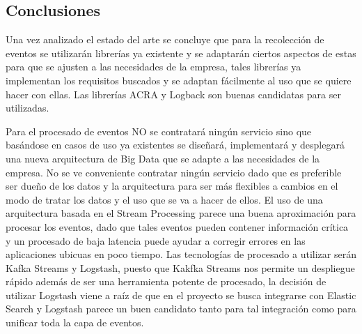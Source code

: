 \subsection{Conclusiones}
Una vez analizado el estado del arte se concluye que para la recolección de eventos se utilizarán librerías ya existente y se adaptarán ciertos aspectos de estas para que se ajusten a las necesidades de la empresa, tales librerías ya implementan los requisitos buscados y se adaptan fácilmente al uso que se quiere hacer con ellas. Las librerías ACRA y Logback son buenas candidatas para ser utilizadas.

Para el procesado de eventos NO se contratará ningún servicio sino que basándose en casos de uso ya existentes se diseñará, implementará y desplegará una nueva arquitectura de Big Data que se adapte a las necesidades de la empresa. No se ve conveniente contratar ningún servicio dado que es preferible ser dueño de los datos y la arquitectura para ser más flexibles a cambios en el modo de tratar los datos y el uso que se va a hacer de ellos. El uso de una arquitectura basada en el Stream Processing parece una buena aproximación para procesar los eventos, dado que tales eventos pueden contener información crítica y un procesado de baja latencia puede ayudar a corregir errores en las aplicaciones ubicuas en poco tiempo. Las tecnologías de procesado a utilizar serán Kafka Streams y Logstash, puesto que Kakfka Streams nos permite un despliegue rápido además de ser una herramienta potente de procesado, la decisión de utilizar Logstash viene a raíz de que en el proyecto se busca integrarse con Elastic Search y Logstash parece un buen candidato tanto para tal integración como para unificar toda la capa de eventos.


